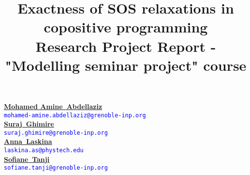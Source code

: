 \documentclass[onecolumn,11pt,a4paper]{article}
\theoremstyle{plain}  %
\theoremstyle{remark}  %
\providecommand*{\hr}[1][class-arg]{%
    \hspace*{\fill}\hrulefill\hspace*{\fill}
    \vskip 0.65\baselineskip
}
\begin{document}
\large
\title{\vspace*{10pt}\Huge{\textbf{Exactness of SOS relaxations in copositive programming}}\\
\vspace*{15pt} \Large{Research Project Report - "Modelling seminar project" course} }
\thispagestyle{plain}
\date{}
\author{}
\maketitle
\hr{}
\renewcommand{\thefootnote}{\fnsymbol{footnote}}
\begin{Large}
\begin{center}
		\href{mailto:Mohamed-Amine.Abdellaziz@grenoble-inp.org}{\textbf{Mohamed Amine~Abdellaziz}}\\
		\textcolor{blue}{\texttt{{mohamed-amine}{.}{abdellaziz}{{@}}{grenoble-inp}{.}{org}}}\\
		\href{mailto:suraj.ghimire@grenoble-inp.org}{\textbf{Suraj~Ghimire}}\\
    	\textcolor{blue}{\texttt{{suraj}{.}{ghimire}{{@}}{grenoble-inp}{.}{org}}}\\
		\href{mailto:laskina.as@phystech.edu}{\textbf{Anna~Laskina}}\\
    	\textcolor{blue}{\texttt{{laskina}{.}{as}{{@}}{phystech}{.}{edu}}}\\
    	\href{mailto:sofiane.tanji@grenoble-inp.org}{\textbf{Sofiane~Tanji}}\\
		\textcolor{blue}{\texttt{{sofiane}{.}{tanji}{{@}}{grenoble-inp}{.}{org}}}\\
\end{center}
\end{Large}
\renewcommand{\thefootnote}{\arabic{footnote}}
\setcounter{footnote}{0}  %
\hr{}
\end{document}
